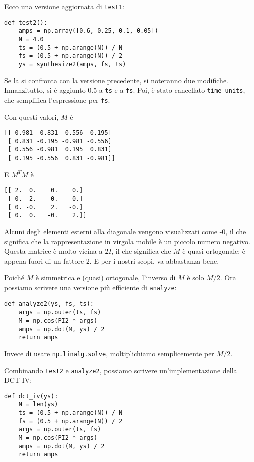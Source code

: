 \documentclass[12pt,a4paper]{book}
\begin{document}
Ecco una versione aggiornata di {\tt test1}:

\begin{verbatim} 
def test2():
    amps = np.array([0.6, 0.25, 0.1, 0.05])
    N = 4.0
    ts = (0.5 + np.arange(N)) / N
    fs = (0.5 + np.arange(N)) / 2
    ys = synthesize2(amps, fs, ts)
 \end{verbatim} 

Se la si confronta con la versione precedente, si noteranno due modifiche. Innanzitutto, si è aggiunto 0.5 a {\tt ts} e a {\tt fs}. Poi, è stato cancellato \verb"time_units", che semplifica l'espressione per {\tt fs}.

Con questi valori, $M$ è

\begin{verbatim} 
[[ 0.981  0.831  0.556  0.195]
 [ 0.831 -0.195 -0.981 -0.556]
 [ 0.556 -0.981  0.195  0.831]
 [ 0.195 -0.556  0.831 -0.981]]
 \end{verbatim} 

E $M^TM$ è

\begin{verbatim} 
[[ 2.  0.    0.    0.]
 [ 0.  2.   -0.    0.]
 [ 0. -0.    2.   -0.]
 [ 0.  0.   -0.    2.]]
 \end{verbatim} 

Alcuni degli elementi esterni alla diagonale vengono visualizzati come -0, il che significa che la rappresentazione in virgola mobile è un piccolo numero negativo. Questa matrice è molto vicina a $2I$, il che significa che $M$ è quasi ortogonale; è appena fuori di un fattore 2. E per i nostri scopi, va abbastanza bene.

Poiché $M$ è simmetrica e (quasi) ortogonale, l'inverso di $M$ è solo $M/2$. Ora possiamo scrivere una versione più efficiente di {\tt analyze}:

\begin{verbatim} 
def analyze2(ys, fs, ts):
    args = np.outer(ts, fs)
    M = np.cos(PI2 * args)
    amps = np.dot(M, ys) / 2
    return amps
 \end{verbatim} 

Invece di usare {\tt np.linalg.solve}, moltiplichiamo semplicemente per $M/2$.

Combinando {\tt test2} e {\tt analyze2}, possiamo scrivere un'implementazione della DCT-IV:

\begin{verbatim} 
def dct_iv(ys):
    N = len(ys)
    ts = (0.5 + np.arange(N)) / N
    fs = (0.5 + np.arange(N)) / 2
    args = np.outer(ts, fs)
    M = np.cos(PI2 * args)
    amps = np.dot(M, ys) / 2
    return amps
 \end{verbatim} 
\end{document}
